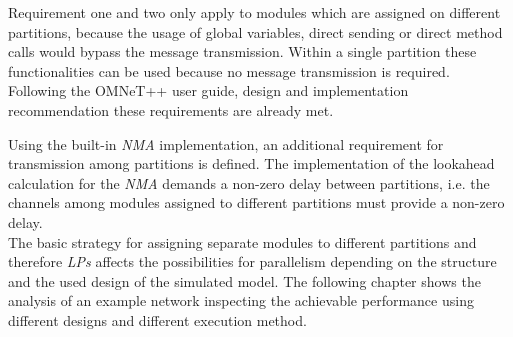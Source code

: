 Requirement one and two only apply to modules which are assigned on different partitions, because the usage of global variables, direct sending or direct method calls would bypass the message transmission.
Within a single partition these functionalities can be used because no message transmission is required.
Following the OMNeT++ user guide, design and implementation recommendation these requirements are already met. \cite[section III.B]{varga_parallel_2003}

Using the built-in \emph{NMA} implementation, an additional requirement for transmission among partitions is defined.
The implementation of the lookahead calculation for the \emph{NMA} demands a non-zero delay between partitions, i.e. the channels among modules assigned to different partitions must provide a non-zero delay. \cite[section 16.3.1]{omnet_manual}
\\

The basic strategy for assigning separate modules to different partitions and therefore \emph{LPs} affects the possibilities for parallelism depending on the structure and the used design of the simulated model.
The following chapter shows the analysis of an example network inspecting the achievable performance using different designs and different execution method.